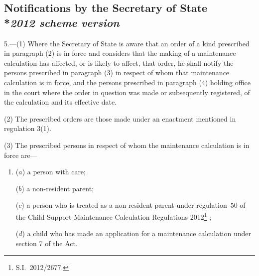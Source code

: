 \documentclass[12pt,a4paper]{article}
\begin{document}

\subsection[5. Notifications by the Secretary of State --- \emph{2012 scheme version}]{Notifications by the Secretary of State\\*\emph{2012 scheme version}}

5.—(1) Where 
the Secretary of State  %
is aware that an order of a kind prescribed in paragraph (2) is in force and considers that the making of a maintenance 
calculation
has affected, or is likely to affect, that order, he shall notify the persons prescribed in paragraph (3) in respect of whom that maintenance 
calculation 
is in force, and the persons prescribed in paragraph (4) holding office in the court where the order in question was made or subsequently registered, of the 
calculation
and its effective date.

(2) The prescribed orders are those made under an enactment mentioned in regulation 3(1).

(3) The prescribed persons in respect of whom the maintenance 
calculation 
is in force are—
\begin{enumerate}\item[]
($a$) a person with care;

($b$) 
a non-resident parent;

($c$) a person who is treated as 
a non-resident parent 
under 
regulation~50 of the Child Support Maintenance Calculation Regulations 2012\footnote{S.I.~2012/2677.}%
;

($d$) a child who has made an application for a maintenance 
calculation under section 7 of the Act.
\end{enumerate}
\end{document}

